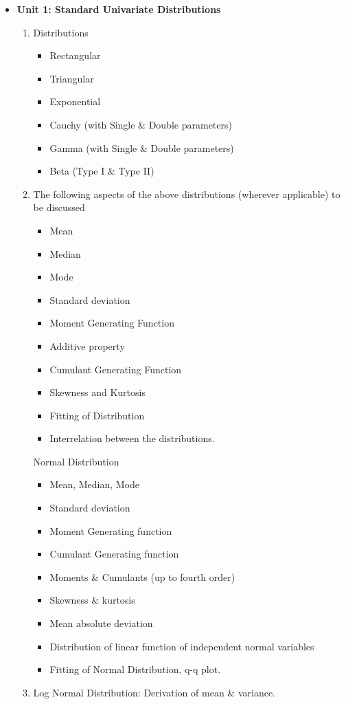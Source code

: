 \documentclass[
10pt, %
a4paper, %
]{report}
\begin{document}
\begin{itemize}
\item[] \textbf{Unit 1: Standard Univariate Distributions}
\begin{enumerate}
\item Distributions
\begin{itemize}
\item Rectangular
\item Triangular
\item Exponential
\item Cauchy (with Single \& Double parameters)
\item Gamma (with Single \& Double parameters)
\item Beta (Type I \& Type II)
\end{itemize}
\item The following aspects of the above distributions (wherever applicable) to be discussed
\begin{itemize}
\item Mean
\item Median
\item Mode
\item Standard deviation
\item Moment Generating Function
\item Additive property
\item Cumulant Generating Function
\item Skewness and Kurtosis
\item Fitting of Distribution
\item Interrelation between the distributions.
\end{itemize}
Normal Distribution
\begin{itemize}
\item Mean, Median, Mode
\item Standard deviation
\item Moment Generating function
\item Cumulant Generating function
\item Moments \& Cumulants (up to fourth order)
\item Skewness \& kurtosis
\item Mean absolute deviation
\item Distribution of linear function of independent normal variables
\item Fitting of Normal Distribution, q-q plot.
\end{itemize}
\item Log Normal Distribution: Derivation of mean \& variance.

\end{enumerate}
\end{itemize}
\end{document}
